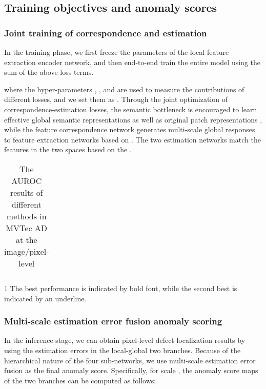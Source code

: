 \documentclass[lettersize,journal]{IEEEtran}
\begin{document}
\subsection{Training objectives and anomaly scores}

\subsubsection{Joint training of correspondence and estimation}
In the training phase, we first freeze the parameters of the local feature extraction encoder network, and then end-to-end train the entire model using the sum of the above loss terms.

where the hyper-parameters , , and  are used to measure the contributions of different losses, and we set them as . Through the joint optimization of correspondence-estimation losses, the semantic bottleneck is encouraged to learn effective global semantic representations  as well as original patch representations , while the feature correspondence network generates multi-scale global responses to feature extraction networks based on . The two estimation networks match the features in the two spaces based on the .


\begin{table*}
\caption{{The AUROC results of different methods in MVTec AD at the image/pixel-level}}
\label{table}
\setlength{\tabcolsep}{3pt}
\begin{threeparttable}
\begin{tabular}{p{\textwidth}}

\end{tabular}
\begin{tablenotes}
       \footnotesize
       \item[1]The best performance is indicated by bold font, while the second best is indicated by an underline.
\end{tablenotes}
\end{threeparttable}
\label{table4}
\end{table*}
\subsubsection{Multi-scale estimation error fusion anomaly scoring}

In the inference stage, we can obtain pixel-level defect localization results by using the estimation errors in the local-global two branches. Because of the hierarchical nature of the four sub-networks, we use multi-scale estimation error fusion as the final anomaly score. Specifically, for scale , the anomaly score maps of the two branches can be computed as follows:
\end{document}
